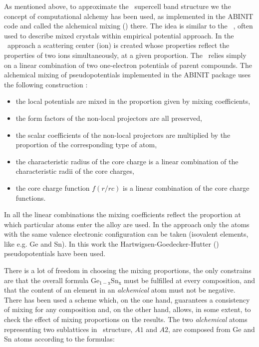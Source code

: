 As mentioned above, to approximate the \abinitio\ supercell band structure we the concept of computational alchemy has been used, as implemented in the ABINIT code \cite{abinit1} and called the alchemical mixing (\AM) there.
The idea is similar to the \VCA\ \cite{vca}, often used to describe mixed crystals within empirical potential approach.
In the \AM\ approach a scattering center (ion) is created whose properties reflect the properties of two ions simultaneously, at a given proportion.
The \VCA\ relies simply on a linear combination of two one-electron potentials of parent compounds.
The alchemical mixing of pseudopotentials implemented in the ABINIT package uses the following construction \cite{abinit2}:
\begin{itemize}
    \item the local potentials are mixed in the proportion given by mixing coefficients,
    \item the form factors of the non-local projectors are all preserved,
    \item the scalar coefficients of the non-local projectors are multiplied by the proportion of the corresponding type of atom,
    \item the characteristic radius of the core charge is a linear combination of the characteristic radii of the core charges,
    \item the core charge function $f(r/rc)$ is a linear combination of the core charge functions.
\end{itemize}

In all the linear combinations the mixing coefficients reflect the proportion at which particular atoms enter the alloy are used.
In the approach only the atoms with the same valence electronic configuration can be taken (isovalent elements, like e.g. Ge and Sn).
In this work the Hartwigsen-Goedecker-Hutter (\HGH) pseudopotentials \cite{hgh} have been used.

There is a lot of freedom in choosing the mixing proportions, the only constrains are that the overall formula $\mathrm{Ge_{1-x}Sn_x}$ must be fulfilled at every composition, and that the content of an element in an \emph{alchemical} atom must not be negative.
There has been used a scheme which, on the one hand, guarantees a consistency of mixing for any composition and, on the other hand, allows, in some extent, to check the effect of mixing proportions on the results.
The two \emph{alchemical} atoms representing two sublattices in \BZ\ structure, $A1$ and $A2$, are composed from Ge and Sn atoms according to the formulas:

